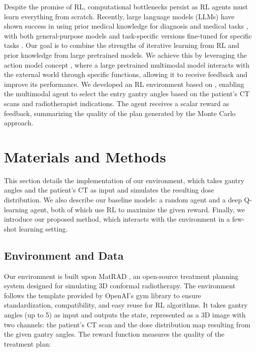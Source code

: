 \documentclass[runningheads]{llncs}
\begin{document}
Despite the promise of RL, computational bottlenecks persist as RL agents must learn everything from scratch. Recently, large language models (LLMs) have shown success in using prior medical knowledge for diagnosis and medical tasks \cite{llm_diagnosis, llm_medicine_application, llm_medicine_review}, with both general-purpose models and task-specific versions fine-tuned for specific tasks \cite{med-llama, med-sam, yagnik2024medlm}. Our goal is to combine the strengths of iterative learning from RL and prior knowledge from large pretrained models. We achieve this by leveraging the action model concept \cite{action_models}, where a large pretrained multimodal model interacts with the external world through specific functions, allowing it to receive feedback and improve its performance. We developed an RL environment based on \cite{matrad}, enabling the multimodal agent to select the entry gantry angles based on the patient's CT scans and radiotherapist indications. The agent receives a scalar reward as feedback, summarizing the quality of the plan generated by the Monte Carlo approach.

\vspace{-2mm}

\section{Materials and Methods}

This section details the implementation of our environment, which takes gantry angles and the patient's CT as input and simulates the resulting dose distribution. We also describe our baseline models: a random agent and a deep Q-learning agent, both of which use RL to maximize the given reward. Finally, we introduce our proposed method, which interacts with the environment in a few-shot learning setting.

\vspace{-2mm}

\subsection{Environment and Data}

Our environment is built upon MatRAD \cite{matrad}, an open-source treatment planning system designed for simulating 3D conformal radiotherapy. The environment follows the template provided by OpenAI's gym library \cite{gym} to ensure standardization, compatibility, and easy reuse for RL algorithms. It takes gantry angles (up to 5) as input and outputs the state, represented as a 3D image with two channels: the patient's CT scan and the dose distribution map resulting from the given gantry angles. The reward function measures the quality of the treatment plan:
\end{document}
